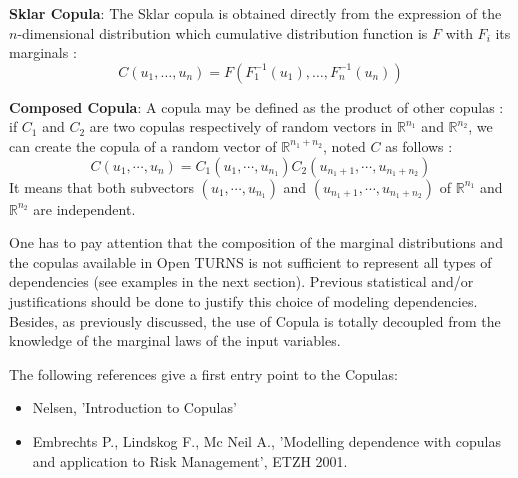 {  {\bf Sklar Copula}: The Sklar copula is obtained directly from the expression of the $n$-dimensional distribution which cumulative distribution function is $F$ with $F_i$ its marginals :
  $$
  C(u_1, \dots, u_n) = F(F_1^{-1}(u_1), \dots, F_n^{-1}(u_n))
  $$


  {\bf Composed Copula}:
  A copula may be defined as the product of other copulas : if $C_1$ and $C_2$ are two copulas respectively of random vectors in  $\mathbb{R}^{n_1}$ and $\mathbb{R}^{n_2}$, we can create the copula of a random vector of $\mathbb{R}^{n_1+n_2}$, noted $C$ as follows :
  $$
  C(u_1, \cdots, u_n) = C_1(u_1, \cdots, u_{n_1}) C_2(u_{n_1+1}, \cdots, u_{n_1+n_2})
  $$
  It means that both subvectors $(u_1, \cdots, u_{n_1})$ and $(u_{n_1+1}, \cdots, u_{n_1+n_2})$ of $\mathbb{R}^{n_1}$ and $\mathbb{R}^{n_2}$ are independent.

}

{

}

{
  One has to pay attention that the composition of the marginal distributions and the copulas available in Open TURNS is not sufficient to represent all types of dependencies (see examples in the next section). Previous statistical and/or justifications should be done to justify this choice of modeling  dependencies. Besides, as previously discussed, the use of Copula is totally decoupled from the knowledge of the marginal laws of the input variables.

  The following references give a first entry point to the Copulas:
  \begin{itemize}
  \item Nelsen, 'Introduction to Copulas'

  \item Embrechts P., Lindskog F., Mc Neil A., 'Modelling dependence with copulas and application to Risk Management', ETZH 2001.

  \end{itemize}
}

